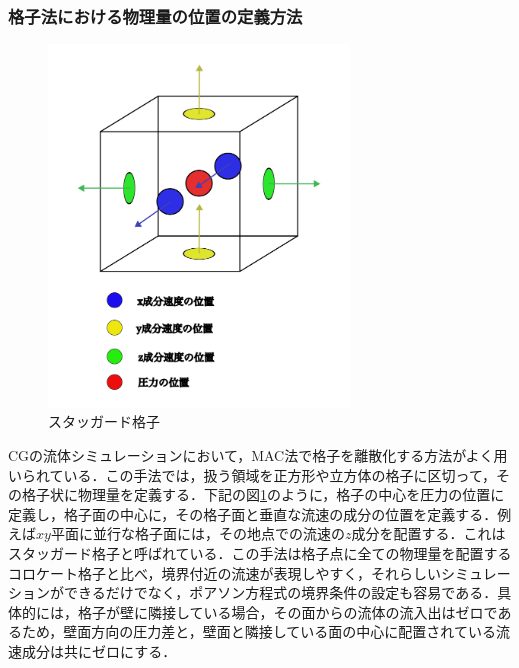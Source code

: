 \documentclass[a4j,12pt]{jreport}
\begin{document}
\subsubsection{格子法における物理量の位置の定義方法} \label{subsec:grid_sampling}
\begin{figure}[htbp]
\begin{center}
\includegraphics[width=80mm]{3dstaggerd.png}
\caption{スタッガード格子}
\label{fig:staggerd}
\end{center}
\end{figure}

CGの流体シミュレーションにおいて，MAC法\cite{MAC}で格子を離散化する方法がよく用いられている．この手法では，扱う領域を正方形や立方体の格子に区切って，その格子状に物理量を定義する．下記の図\ref{fig:staggerd}のように，格子の中心を圧力の位置に定義し，格子面の中心に，その格子面と垂直な流速の成分の位置を定義する．例えば$xy$平面に並行な格子面には，その地点での流速の$z$成分を配置する．これはスタッガード格子と呼ばれている．この手法は格子点に全ての物理量を配置するコロケート格子と比べ，境界付近の流速が表現しやすく，それらしいシミュレーションができるだけでなく，ポアソン方程式の境界条件の設定も容易である．具体的には，格子が壁に隣接している場合，その面からの流体の流入出はゼロであるため，壁面方向の圧力差と，壁面と隣接している面の中心に配置されている流速成分は共にゼロにする．
\end{document}
